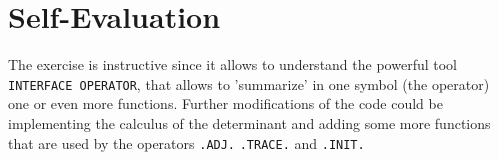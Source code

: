 \documentclass{article}
\begin{document}
\section*{Self-Evaluation}
The exercise is instructive since it allows to understand the powerful tool \texttt{INTERFACE OPERATOR}, that allows to 'summarize' in one symbol (the operator) one or even more functions. Further modifications of the code could be implementing the calculus of the determinant and adding some more functions that are used by the operators \texttt{.ADJ.}  \texttt{.TRACE.} and \texttt{.INIT.}
\end{document}
